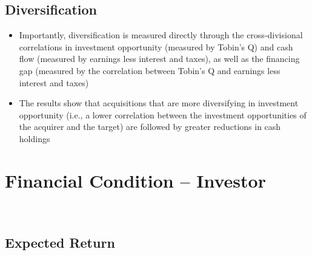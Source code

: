 \documentclass[12pt]{article}
\begin{document}
\subsection{Diversification}

    \begin{itemize}
        \item Importantly, diversification is measured directly through the cross-divisional correlations in investment opportunity (measured by Tobin’s Q) and cash flow (measured by earnings less interest and taxes), as well as the financing gap (measured by the correlation between Tobin’s Q and earnings less interest and taxes) \citep{DUCHIN2010}
        \item The results show that acquisitions that are more diversifying in investment opportunity (i.e., a lower correlation between the investment opportunities of the acquirer and the target) are followed by greater reductions in cash holdings \citep{DUCHIN2010}
    \end{itemize}

\section{Financial Condition -- Investor}

    \




\subsection{Expected Return}    
\end{document}
